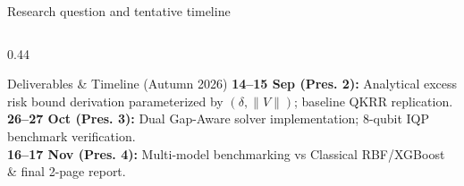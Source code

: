 \documentclass[aspectratio=169, 10pt]{beamer}
\begin{document}
\begin{frame}{Research question and tentative timeline}
\begin{columns}[T]
\begin{column}{0.44\textwidth}
        \vspace{-0.15cm}
        \begin{block}{\scriptsize Deliverables \& Timeline (Autumn 2026)}
            \tiny
            \textbf{14--15 Sep (Pres. 2):} Analytical excess risk bound derivation parameterized by $(\delta, \|V\|)$; baseline QKRR replication.\\
            \textbf{26--27 Oct (Pres. 3):} Dual Gap-Aware solver implementation; 8-qubit IQP benchmark verification.\\
            \textbf{16--17 Nov (Pres. 4):} Multi-model benchmarking vs Classical RBF/XGBoost \& final 2-page report.
        \end{block}
    \end{column}
\end{columns}
\end{frame}
\end{document}
